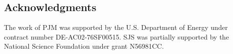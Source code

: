 \documentclass[\docopts]{\docclass}
\begin{document}
\subsection*{Acknowledgments}


The work of PJM was supported by the U.S. Department of Energy under contract 
number DE-AC02-76SF00515.
SJS was partially supported by the National Science Foundation under grant 
N56981CC.








\end{document}
